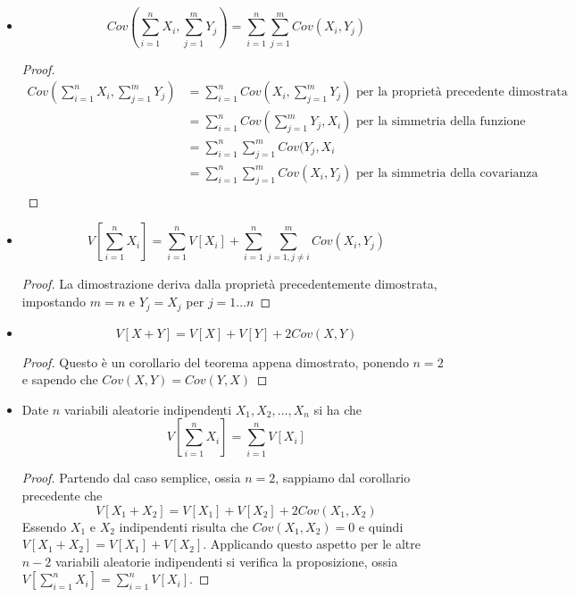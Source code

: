 \documentclass[a4paper,12pt, oneside]{book}
\begin{document}
\begin{itemize}
\begin{proof}
          \end{proof}
    \item \[ Cov(\sum _{i = 1}^n X_i, \sum_{j = 1} ^m Y_j) = \sum _{i = 1}^n \sum _{j = 1} ^m Cov(X_i, Y_j) \]
          \begin{proof}
              \[ \begin{split}
                  Cov(\sum _{i = 1}^n X_i, \sum_{j = 1} ^m Y_j) 
                        & = \sum _{i = 1}^n Cov(X_i, \sum _{j = 1}^m Y_j) \mbox{ per la proprietà precedente dimostrata}\\
                        & = \sum _{i = 1}^n Cov(\sum _{j = 1}^m Y_j, X_i) \mbox{ per la simmetria della funzione}\\
                        & = \sum _{i = 1}^n \sum _{j = 1}^m Cov(Y_j, X_i \\
                        & = \sum _{i = 1}^n \sum _{j = 1}^m Cov(X_i, Y_j) \mbox{ per la simmetria della covarianza}\\
                  \end{split} \]
          \end{proof}
    \item \[ V[\sum _{i = 1}^n X_i] = \sum _{i = 1}^n V[X_i] + \sum _{i = 1}^n \sum_{j = 1, j \neq i}^m Cov(X_i, Y_j) \]
          \begin{proof}
              La dimostrazione deriva dalla proprietà precedentemente dimostrata, impostando $m = n$ e $Y_j = X_j$
              per $j = 1\dots n$
          \end{proof}
    \item \[ V[X + Y] = V[X] + V[Y] + 2Cov(X, Y) \]
          \begin{proof}
              Questo è un corollario del teorema appena dimostrato, ponendo $n = 2$ e sapendo che $Cov(X, Y) = Cov(Y, X)$
          \end{proof}
    \item Date $n$ variabili aleatorie indipendenti $X_1, X_2, \dots, X_n$ si ha che
          \[ V[\sum _{i = 1}^n X_i] = \sum _{i = 1}^n V[X_i] \]
          \begin{proof}
              Partendo dal caso semplice, ossia $n = 2$, sappiamo dal corollario precedente che 
              \[ V[X_1 + X_2] = V[X_1] + V[X_2] + 2Cov(X_1, X_2) \]
              Essendo $X_1$ e $X_2$ indipendenti risulta che $Cov(X_1, X_2) = 0$ e quindi $V[X_1 + X_2] = V[X_1] + V[X_2]$.\newline
              Applicando questo aspetto per le altre $n - 2$ variabili aleatorie indipendenti si verifica la
              proposizione, ossia $V[\sum _{i = 1}^n X_i] = \sum _{i = 1}^n V[X_i]$.
          \end{proof}
\end{itemize}
\end{document}
